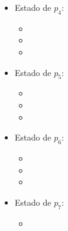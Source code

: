 \begin{multicols}{2}
\begin{itemize}
\begin{itemize}
      \item {}
      \end{itemize}

\item Estado de $p_4$:
      \begin{itemize}
      \item {}
      
      \item {}
      
      \item {}
      \end{itemize}

\item Estado de $p_5$:
      \begin{itemize}
      \item {}
      
      \item {}
      
      \item {}
      \end{itemize}

\item Estado de $p_6$:
      \begin{itemize}
      \item {}
      
      \item {}
      
      \item {}
      \end{itemize}

\item Estado de $p_7$:
      \begin{itemize}
      \item {}
      

\end{itemize}
\end{itemize}
\end{multicols}
